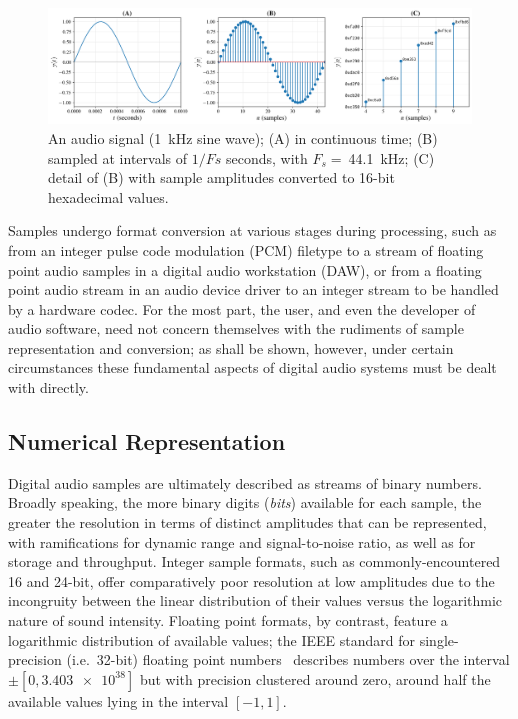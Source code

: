 \begin{figure}[ht]
    \centering
    \includegraphics[width=\textwidth]{figures/digital-signal}
    \caption{
        An audio signal (\qty{1}{\kHz} sine wave);
        (A) in continuous time;
        (B) sampled at intervals of $1/Fs$ seconds, with $F_s=~$\qty{44.1}{\kHz};
        (C) detail of (B) with sample amplitudes converted to 16-bit hexadecimal
        values.
    }
    \label{fig:signal-samples}
\end{figure}

Samples undergo format conversion at various stages during processing, such as
from an integer pulse code modulation (PCM) filetype to a stream of floating
point audio samples in a digital audio workstation (DAW), or from a floating
point audio stream in an audio device driver to an integer stream to be handled
by a hardware codec.
For the most part, the user, and even the developer of audio software, need not
concern themselves with the rudiments of sample representation and conversion;
as shall be shown, however, under certain circumstances these fundamental
aspects of digital audio systems must be dealt with directly.

\subsection{Numerical Representation}\label{subsec:numerical-representation}

Digital audio samples are ultimately described as streams of binary numbers.
Broadly speaking, the more binary digits (\textit{bits}) available for each
sample, the greater the resolution in terms of distinct amplitudes that can be
represented, with ramifications for dynamic range and signal-to-noise ratio, as
well as for storage and throughput.
Integer sample formats, such as commonly-encountered 16 and 24-bit, offer
comparatively poor resolution at low amplitudes due to the incongruity between
the linear distribution of their values versus the logarithmic nature of sound
intensity.
Floating point formats, by contrast, feature a logarithmic distribution of
available values; the IEEE standard for single-precision (i.e.\ 32-bit) floating
point numbers~\citep{ieee_ieee_1985} describes numbers over the interval
$\pm[0,\num{3.403e38}]$ but with precision clustered around zero, around half
the available values lying in the interval $[-1, 1]$.

